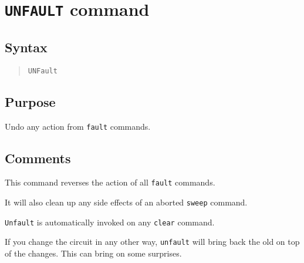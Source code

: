 %
%
%
%
\section{{\tt UNFAULT} command}
\subsection{Syntax}
\begin{verse}
{\tt UNFault}
\end{verse}
\subsection{Purpose}

Undo any action from {\tt fault} commands.
\subsection{Comments}

This command reverses the action of all {\tt fault} commands.

It will also clean up any side effects of an aborted {\tt sweep} command.

{\tt Unfault} is automatically invoked on any {\tt clear} command.

If you change the circuit in any other way, {\tt unfault} will bring back the
old on top of the changes.  This can bring on some surprises.
